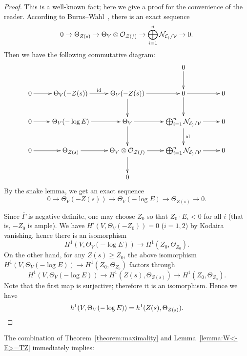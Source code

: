 \documentclass[a4paper, reqno, twoside]{amsart}
\theoremstyle{definition}
\numberwithin{equation}{section}
\begin{document}
\begin{proof}
This is a well-known fact; here we give a proof for the convenience of
the reader. According to Burns--Wahl~\cite[Subsection~(1.6)]{Burns-Wahl-1974},
there is an exact sequence
\begin{equation}\label{equation:TZ}
0 \to \Theta_{Z(s)} \to \Theta_V \otimes {\ensuremath \mathcal{O_{Z(s)}}} \to \bigoplus_{i=1}^{n} {\ensuremath \mathcal{N_{E_i/V}}} \to 0.
\end{equation}
Then we have the following commutative diagram:
\begin{equation*}
\xymatrix{
 & & & 0 \ar[d] & \\
0 \ar[r] & \Theta_V(-Z(s)) \ar[r]^{\text{id}} & \Theta_V(-Z(s)) \ar[d] \ar[r] & 0 \ar[d] \ar[r] & 0 \\
0 \ar[r] & \Theta_V(-\log{E}) \ar[r] & \Theta_V \ar[r] \ar[d] & \bigoplus_{i=1}^{n} {\ensuremath \mathcal{N_{E_i/V}}} \ar[r] \ar[d]^{\text{id}} & 0 \\
0 \ar[r] & \Theta_{Z(s)} \ar[r] & \Theta_V \otimes {\ensuremath \mathcal{O_{Z(s)}}} \ar[r] \ar[d] & \bigoplus_{i=1}^{n} {\ensuremath \mathcal{N_{E_i/V}}} \ar[r] & 0\\
& & 0 & &
}
\end{equation*}
By the snake lemma, we get an exact sequence
\begin{equation}\label{equation:T(-Z)-T<-Z>-TZ}
0 \to \Theta_V(-Z(s)) \to \Theta_V(-\log{E}) \to \Theta_{Z(s)} \to 0.
\end{equation}

Since $\overline{\Gamma}$ is negative definite, one may choose $Z_0$
so that $Z_0 \cdot E_i < 0$ for all $i$ (that is, $-Z_0$ is ample). We
have $H^i(V, \Theta_V(-Z_0))=0$ ($i=1,2$) by Kodaira vanishing, hence
there is an isomorphism
\[H^1(V, \Theta_V(-\log{E})) \to H^1(Z_0, \Theta_{Z_0}).\]
On the other hand, for any $Z(s) \ge Z_0$, the above isomorphism $H^1(V,
\Theta_V(-\log{E})) \to H^1(Z_0, \Theta_{Z_0})$ factors through
\[
H^1(V, \Theta_V(-\log{E})) \to H^1(Z(s), \Theta_{Z(s)}) \to H^1(Z_0,
\Theta_{Z_0}).
\]
Note that the first map is surjective; therefore it is an
isomorphism. Hence we have
\begin{equation*}
h^1(V, \Theta_V(-\log{E}))=h^1(Z(s), \Theta_{Z(s)}). \qedhere
\end{equation*}
\end{proof}

The combination of Theorem~\ref{theorem:maximality} and
Lemma~\ref{lemma:W<-E>=TZ} immediately implies:
\end{document}
